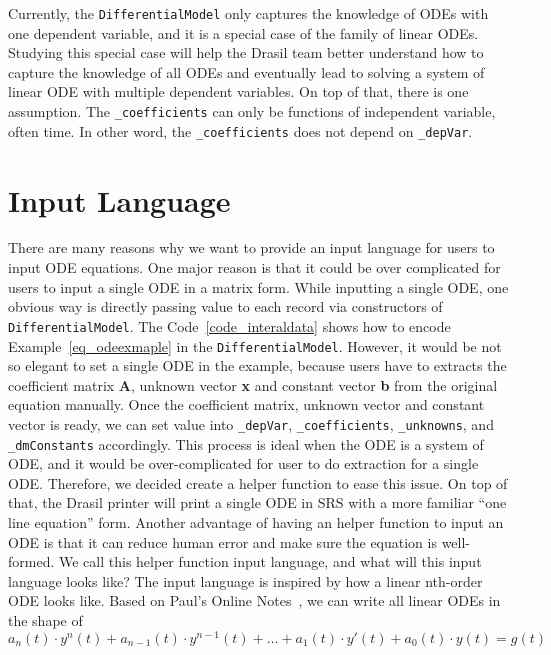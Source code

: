 Currently, the \verb|DifferentialModel| only captures the knowledge of ODEs with one dependent variable, and it is a special case of the family of linear ODEs. Studying this special case will help the Drasil team better understand how to capture the knowledge of all ODEs and eventually lead to solving a system of linear ODE with multiple dependent variables. On top of that, there is one assumption. The \verb|_coefficients| can only be functions of independent variable, often time. In other word, the \verb|_coefficients| does not depend on \verb|_depVar|.

\section{Input Language}
\label{sec_input}
There are many reasons why we want to provide an input language for users to input ODE equations. One major reason is that it could be over complicated for users to input a single ODE in a matrix form. While inputting a single ODE, one obvious way is directly passing value to each record via constructors of \verb|DifferentialModel|. The Code~\ref{code_interaldata} shows how to encode Example~\ref{eq_odeexmaple} in the \verb|DifferentialModel|. However, it would be not so elegant to set a single ODE in the example, because users have to extracts the coefficient matrix \textbf{A}, unknown vector \textbf{x} and constant vector \textbf{b} from the original equation manually. Once the coefficient matrix, unknown vector and constant vector is ready, we can set value into \verb|_depVar|, \verb|_coefficients|, \verb|_unknowns|, and \verb|_dmConstants| accordingly. This process is ideal when the ODE is a system of ODE, and it would be over-complicated for user to do extraction for a single ODE. Therefore, we decided create a helper function to ease this issue. On top of that, the Drasil printer will print a single ODE in SRS with a more familiar ``one line equation'' form. Another advantage of having an helper function to input an ODE is that it can reduce human error and make sure the equation is well-formed. We call this helper function input language, and what will this input language looks like? The input language is inspired by how a linear nth-order ODE looks like. Based on Paul's Online Notes~\citep{paullinearode}, we can write all linear ODEs in the shape of 
\begin{equation} \label{eq_linearDE}
	a_n(t) \cdot y^n(t) + a_{n-1}(t) \cdot y^{n-1}(t) + \dots + a_1(t) \cdot y'(t) + a_0(t) \cdot y(t) = g(t)
\end{equation}


